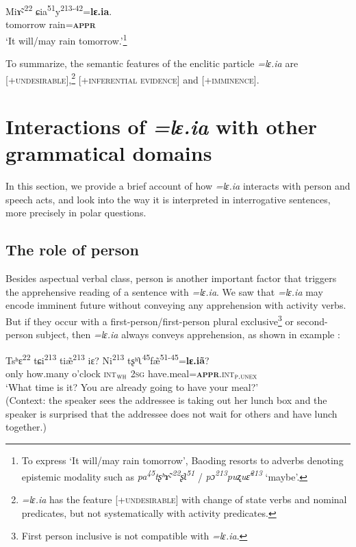 \documentclass[output=paper,colorlinks,citecolor=brown, language=chinese]{langscibook}
\begin{document}
\ea\label{ex:Song33}
\gll \*Mi\~ɤ˞\textsuperscript{22} ɕia\textsuperscript{51}y\textsuperscript{213-42}=\textbf{lɛ.ia}. \\
tomorrow rain=\textsc{\textbf{appr}}\\
\glt `It will/may rain tomorrow.'\footnote{To express `It will/may rain tomorrow', Baoding resorts to adverbs denoting epistemic modality such as \textit{pa\textsuperscript{45}tʂʰ\~ɤ˞\textsuperscript{22}ʂʅ\textsuperscript{51}} / \textit{pɔ\textsuperscript{213}puʐu\~ɛ\textsuperscript{213}} `maybe'. }
\z

To summarize, the semantic features of the enclitic particle \textit{=lɛ.ia} are [+\textsc{unde\-sir\-able}],\footnote{\textit{=lɛ.ia} has the feature [+\textsc{undesirable}] with change of state verbs and nominal predicates, but not systematically with activity predicates.} [+\textsc{inferential evidence}] and [+\textsc{imminence}].


\section{Interactions of \textit{=lɛ.ia} with other grammatical domains}
\label{sec:leiaperson}

In this section, we provide a brief account of how \textit{=lɛ.ia} interacts with person and speech acts, and look into the way it is interpreted in interrogative sentences, more precisely in polar questions.


\subsection{The role of person}
\label{subsec:person}

Besides aspectual verbal class, person is another important factor that triggers the apprehensive reading of a sentence with \textit{=lɛ.ia}. We saw that \textit{=lɛ.ia} may encode imminent future without conveying any apprehension with activity verbs. But if they occur with a first-person/first-person plural exclusive\footnote{First person inclusive is not compatible with \textit{=lɛ.ia}.} or second-person subject, then \textit{=lɛ.ia} always conveys apprehension, as shown in example :

\ea\label{ex:Song34}
\gll Tsʰɛ\textsuperscript{22} tɕi\textsuperscript{213} ti\~æ\textsuperscript{213} iɛ? Ni\textsuperscript{213} tʂʰʅ\textsuperscript{45}f\~æ\textsuperscript{51-45}=\textbf{lɛ.i\~a}? \\
only how.many o'clock \textsc{int}$_{\textsc{wh}}$ \textsc{2sg} have.meal=\textsc{\textbf{appr}.int}$_{\textsc{p.unex}}$ \\
\glt `What time is it? You are already going to have your meal?' \\
(Context: the speaker sees the addressee is taking out her lunch box and the speaker is 	surprised that the addressee does not wait for others and have lunch together.)
\z
\end{document}

